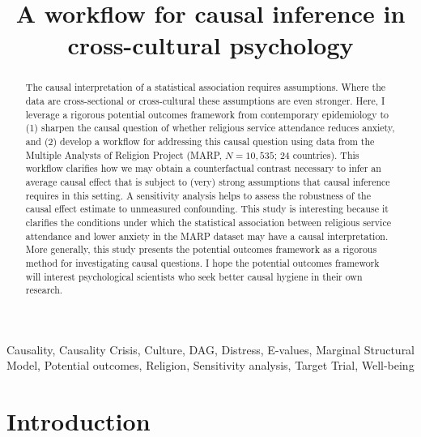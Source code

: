 \documentclass[]{interact}
\theoremstyle{plain}%
\theoremstyle{definition}
\theoremstyle{remark}
\begin{document}

\title{A workflow for causal inference in cross-cultural psychology}

\author{
}

\maketitle

\begin{abstract}
The causal interpretation of a statistical association requires assumptions. Where the data are cross-sectional or cross-cultural these assumptions are even stronger. Here, I leverage a rigorous potential outcomes framework from contemporary epidemiology to (1) sharpen the causal question of whether religious service attendance reduces anxiety, and (2) develop a workflow for addressing this causal question using data from the Multiple Analysts of Religion Project (MARP, $N = 10,535$; 24 countries). This workflow clarifies how we may obtain a counterfactual contrast necessary to infer an average causal effect that is subject to (very) strong assumptions that causal inference requires in this setting. A sensitivity analysis helps to assess the robustness of the causal effect estimate to unmeasured confounding. This study is interesting because it clarifies the conditions under which the statistical association between religious service attendance and lower anxiety in the MARP dataset may have a causal interpretation. More generally, this study presents the potential outcomes framework as a rigorous method for investigating causal questions. I hope the potential outcomes framework will interest psychological scientists who seek better causal hygiene in their own research. 
\end{abstract}

\begin{keywords}
Causality, Causality Crisis, Culture, DAG, Distress, E-values, Marginal Structural Model, Potential outcomes, Religion, Sensitivity analysis, Target Trial, Well-being
\end{keywords}


\section{Introduction}
\end{document}

